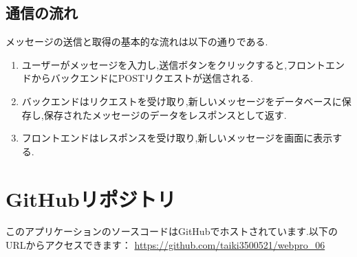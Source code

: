 \documentclass[uplatex,dvipdfmx]{jsarticle}
\begin{document}
\subsection{通信の流れ}
メッセージの送信と取得の基本的な流れは以下の通りである.
\begin{enumerate}
    \item ユーザーがメッセージを入力し,送信ボタンをクリックすると,フロントエンドからバックエンドにPOSTリクエストが送信される.
    \item バックエンドはリクエストを受け取り,新しいメッセージをデータベースに保存し,保存されたメッセージのデータをレスポンスとして返す.
    \item フロントエンドはレスポンスを受け取り,新しいメッセージを画面に表示する.
\end{enumerate}

\section{GitHubリポジトリ}
このアプリケーションのソースコードはGitHubでホストされています.以下のURLからアクセスできます：
\url{https://github.com/taiki3500521/webpro_06}
\end{document}

